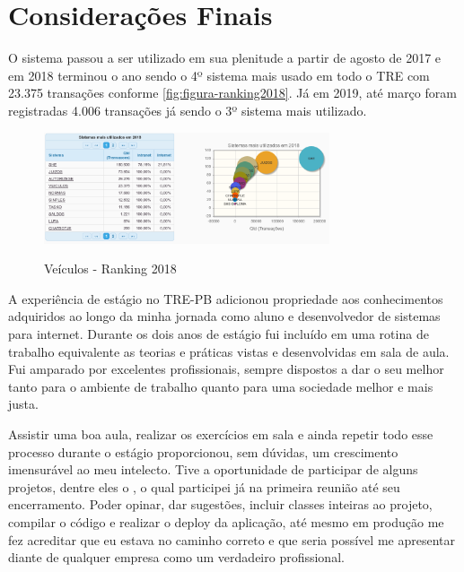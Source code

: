 
\chapter{Considerações Finais}
\label{chap:consideracoesFinais}


O sistema passou a ser utilizado em sua plenitude a partir de agosto de 2017 e em 2018 terminou o ano sendo o 4º sistema mais usado em todo o TRE com 23.375 transações conforme \autoref{fig:figura-ranking2018}. Já em 2019, até março foram registradas 4.006 transações já sendo o 3º sistema mais utilizado.

\begin{figure}[!htb]
    \centering
    \caption{Veículos - Ranking 2018}
    \includegraphics[width=0.75\textwidth]{./dados/figuras/ranking2018.png}
    \label{fig:figura-ranking2018}
\end{figure}

A experiência de estágio no TRE-PB adicionou propriedade aos conhecimentos adquiridos ao longo da minha jornada como aluno e desenvolvedor de sistemas para internet. 
Durante os dois anos de estágio fui incluído em uma rotina de trabalho equivalente as teorias e práticas vistas e desenvolvidas em sala de aula. 
Fui amparado por excelentes profissionais, sempre dispostos a dar o seu melhor tanto para o ambiente de trabalho quanto para uma sociedade melhor e mais justa.

Assistir uma boa aula, realizar os exercícios em sala e ainda repetir todo esse processo durante o estágio proporcionou, sem dúvidas, um crescimento imensurável ao meu intelecto. Tive a oportunidade de participar de alguns projetos, dentre eles o \imprimirtitulo \space, o qual participei já na primeira reunião até seu encerramento. Poder opinar, dar sugestões, incluir classes inteiras ao projeto, compilar o código e realizar o deploy da aplicação, até mesmo em produção me fez acreditar que eu estava no caminho correto e que seria possível me apresentar diante de qualquer empresa como um verdadeiro profissional.


